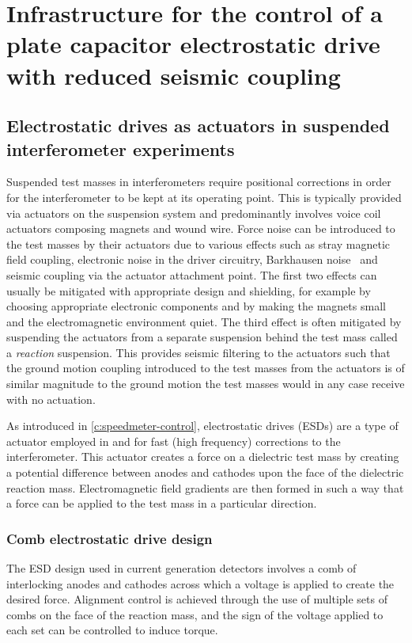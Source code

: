 \chapter{\label{c:esd-concept}Infrastructure for the control of a plate capacitor electrostatic drive with reduced seismic coupling}

\section{Electrostatic drives as actuators in suspended interferometer experiments}
Suspended test masses in interferometers require positional corrections in order for the interferometer to be kept at its operating point. This is typically provided via actuators on the suspension system and predominantly involves voice coil actuators composing magnets and wound wire. Force noise can be introduced to the test masses by their actuators due to various effects such as stray magnetic field coupling, electronic noise in the driver circuitry, Barkhausen noise~\cite{Weiss2008} and seismic coupling via the actuator attachment point. The first two effects can usually be mitigated with appropriate design and shielding, for example by choosing appropriate electronic components and by making the magnets small and the electromagnetic environment quiet. The third effect is often mitigated by suspending the actuators from a separate suspension behind the test mass called a \emph{reaction} suspension. This provides seismic filtering to the actuators such that the ground motion coupling introduced to the test masses from the actuators is of similar magnitude to the ground motion the test masses would in any case receive with no actuation.

As introduced in \cref{c:speedmeter-control}, electrostatic drives (\glspl{ESD}) are a type of actuator employed in \GEO{} and \ALIGO{} for fast (high frequency) corrections to the interferometer. This actuator creates a force on a dielectric test mass by creating a potential difference between anodes and cathodes upon the face of the dielectric reaction mass. Electromagnetic field gradients are then formed in such a way that a force can be applied to the test mass in a particular direction.

\subsection{Comb electrostatic drive design}
The \gls{ESD} design used in current generation detectors involves a comb of interlocking anodes and cathodes across which a voltage is applied to create the desired force. Alignment control is achieved through the use of multiple sets of combs on the face of the reaction mass, and the sign of the voltage applied to each set can be controlled to induce torque.


